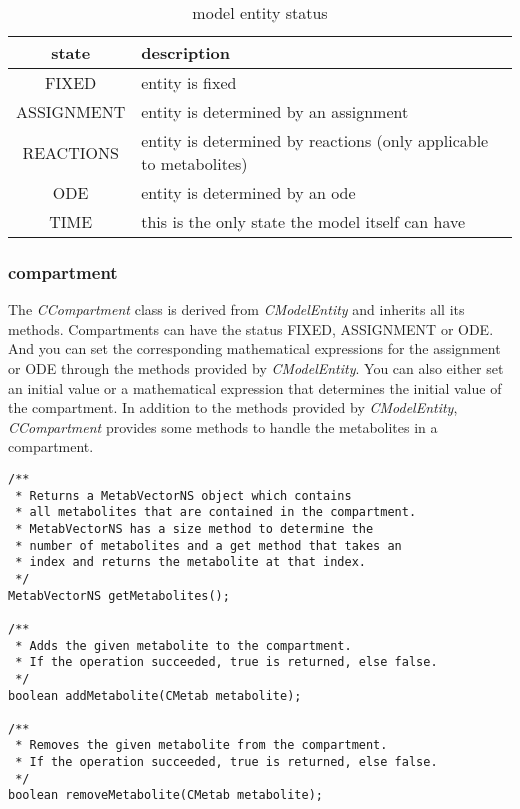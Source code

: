 \documentclass[a4,10pt]{article}
\begin{document}
\begin{table}[ht]
\begin{tabular}{c|l}
state & description \\ \hline \hline
FIXED & entity is fixed \\ \hline
ASSIGNMENT & entity is determined by an assignment \\ \hline
REACTIONS & entity is determined by reactions (only applicable to metabolites) \\ \hline
ODE & entity is determined by an ode \\ \hline
TIME & this is the only state the model itself can have \\ \hline
\end{tabular}
\caption{model entity status}
\label{ModelEntityStatus}
\end{table}

\subsubsection{compartment}
The \textit{CCompartment} class is derived from \textit{CModelEntity} and inherits all its methods. Compartments can have the status FIXED, ASSIGNMENT or ODE. And you can set the corresponding mathematical expressions for the assignment or ODE through the methods provided by \textit{CModelEntity}. You can also either set an initial value or a mathematical expression that determines the initial value of the compartment.
In addition to the methods provided by \textit{CModelEntity}, \textit{CCompartment} provides some methods to handle the metabolites in a compartment.

\begin{lstlisting}
/**
 * Returns a MetabVectorNS object which contains 
 * all metabolites that are contained in the compartment.
 * MetabVectorNS has a size method to determine the
 * number of metabolites and a get method that takes an 
 * index and returns the metabolite at that index.
 */
MetabVectorNS getMetabolites();

/**
 * Adds the given metabolite to the compartment.
 * If the operation succeeded, true is returned, else false.
 */
boolean addMetabolite(CMetab metabolite);

/**
 * Removes the given metabolite from the compartment.
 * If the operation succeeded, true is returned, else false.
 */
boolean removeMetabolite(CMetab metabolite);
\end{lstlisting}
\end{document}
